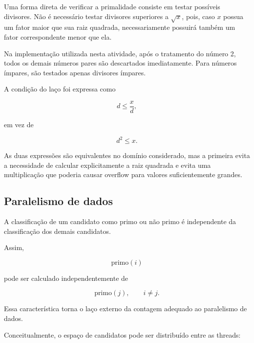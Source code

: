 Uma forma direta de verificar a primalidade consiste em testar possíveis
divisores. Não é necessário testar divisores superiores a \(\sqrt{x}\),
pois, caso \(x\) possua um fator maior que sua raiz quadrada, necessariamente
possuirá também um fator correspondente menor que ela.

Na implementação utilizada nesta atividade, após o tratamento do número 2,
todos os demais números pares são descartados imediatamente. Para números
ímpares, são testados apenas divisores ímpares.

A condição do laço foi expressa como

\[
d \leq \frac{x}{d},
\]

em vez de

\[
d^2 \leq x.
\]

As duas expressões são equivalentes no domínio considerado, mas a primeira
evita a necessidade de calcular explicitamente a raiz quadrada e evita uma
multiplicação que poderia causar overflow para valores suficientemente
grandes.


\subsection{Paralelismo de dados}

A classificação de um candidato como primo ou não primo é independente da
classificação dos demais candidatos.

Assim,

\[
\text{primo}(i)
\]

pode ser calculado independentemente de

\[
\text{primo}(j),
\qquad i \neq j.
\]

Essa característica torna o laço externo da contagem adequado ao
paralelismo de dados.

Conceitualmente, o espaço de candidatos pode ser distribuído entre as
threads:

